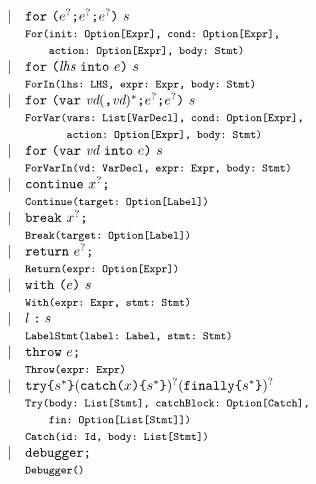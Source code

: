 \[
\begin{array}{llll}
  &\mid& {\tt for} \ \verb+(+\expr^?\verb+;+ \expr^?\verb+;+ \expr^? \verb+)+ \ \stmt\\
&& \mtt{For(init:~Option[Expr], cond:~Option[Expr],}\\
&&\mtt{\phantom{For(}action:~Option[Expr], body:~Stmt)}\\
  &\mid& {\tt for} \ \verb+(+ \lhs \ {\tt into} \ \expr \verb+)+ \ \stmt \\
&&\mtt{ForIn(lhs:~LHS, expr:~Expr, body:~Stmt)}\\
  &\mid& {\tt for} \ \verb+(+{\tt var} \ \vd(\verb+,+ \vd)^*\verb+;+ \expr^?\verb+;+ \expr^?\verb+)+ \ \stmt\\
&& \mtt{ForVar(vars:~List[VarDecl], cond:~Option[Expr],}\\
&&\mtt{\phantom{ForVar(}action:~Option[Expr], body:~Stmt)}\\
&\mid& {\tt for} \ \verb+(+{\tt var} \ \vd \ {\tt into} \ \expr \verb+)+ \ \stmt \\
&& \mtt{ForVarIn(vd:~VarDecl, expr:~Expr, body:~Stmt)}\\
& \mid & {\tt continue} \  \myid^{?} \verb+;+ \\
&& \mtt{Continue(target:~Option[Label])}\\
& \mid & {\tt break} \  \myid^{?} \verb+;+ \\
&& \mtt{Break(target:~Option[Label])}\\
& \mid & {\tt return} \ \expr^? \verb+;+ \\
&& \mtt{Return(expr:~Option[Expr])}\\
& \mid & {\tt with} \ \verb+(+\expr\verb+)+ \ \stmt \\
&& \mtt{With(expr:~Expr, stmt:~Stmt)}\\
& \mid & l \; \verb+:+ \; \stmt \\
&& \mtt{LabelStmt(label:~Label, stmt:~Stmt)}\\
& \mid & {\tt throw} \ \expr \verb+;+ \\
&& \mtt{Throw(expr:~Expr)}\\

& \mid &
{\tt try} \verb+{+\stmt^*\verb+}+ ({\tt catch} \verb+(+\myid\verb+)+ \verb+{+\stmt^*\verb+}+)^? ({\tt finally} \verb+{+\stmt^*\verb+}+)^?\\
&& \mtt{Try(body:~List[Stmt], catchBlock:~Option[Catch],}\\
&& \mtt{\phantom{Try(}fin:~Option[List[Stmt]])}\\
&& \mtt{Catch(id:~Id, body:~List[Stmt])}\\
& \mid & {\tt debugger} \verb+;+ \\
&& \mtt{Debugger()}\\\\


\end{array}\]
